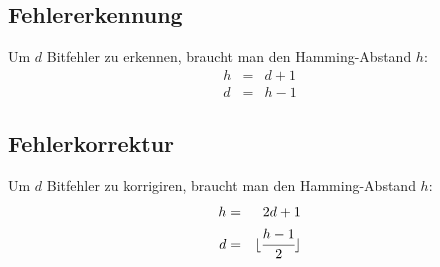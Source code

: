 \documentclass[a4paper, landscape]{article}
\begin{document}
\begin{multicols}{3}
        \subsection{Fehlererkennung}
        Um $d$ Bitfehler zu erkennen, braucht man den Hamming-Abstand $h$:
        \begin{eqnarray}
            h &=& d + 1 \nonumber \\
            d &=& h - 1 \nonumber
        \end{eqnarray}
        
        \subsection{Fehlerkorrektur}
        Um $d$ Bitfehler zu korrigiren, braucht man den Hamming-Abstand $h$:
        \begin{eqnarray}
            h &=& 2d + 1 \nonumber \\
            d &=& \lfloor \cfrac{h - 1}{2} \rfloor \nonumber
        \end{eqnarray}
        

\end{multicols}
\end{document}
